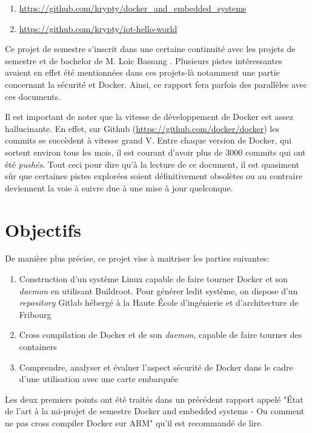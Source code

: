 \documentclass[11pt,a4paper,oneside]{report}
\newcommand{\school}{Haute École d'ingénierie et d'architecture de Fribourg}
\newcommand{\oldreportname}{État de l’art à la mi-projet de semestre Docker and embedded systems - Ou comment ne pas cross compiler Docker sur ARM}
\begin{document}
\begin{enumerate}
\item \url{https://github.com/krypty/docker_and_embedded_systems}
\item \url{https://github.com/krypty/iot-hello-world}
\end{enumerate}


Ce projet de semestre s'inscrit dans une certaine continuité avec les projets de semestre et de bachelor de M. Loic Bassang \cite{bassang_bachelor}. Plusieurs pistes intéressantes avaient en effet été mentionnées dans ces projets-là notamment une partie concernant la sécurité et Docker. Ainsi, ce rapport fera parfois des parallèles avec ces documents.

Il est important de noter que la vitesse de développement de Docker est assez hallucinante. En effet, sur Github (\url{https://github.com/docker/docker}) les commits se succèdent à vitesse grand V. Entre chaque version de Docker, qui sortent environ tous les mois, il est courant d'avoir plus de 3000 commits qui ont été \emph{pushés}. Tout ceci pour dire qu'à la lecture de ce document, il est quasiment sûr que certaines pistes explorées soient définitivement obsolètes ou au contraire deviennent la voie à suivre due à une mise à jour quelconque.


\section{Objectifs}

De manière plus précise, ce projet vise à maitriser les parties suivantes:

\begin{enumerate}
  \item Construction d'un système Linux capable de faire tourner Docker et son \emph{daemon} en utilisant Buildroot. Pour générer ledit système, on dispose d'un \emph{repository} Gitlab hébergé à la \school

  \item Cross compilation de Docker et de son \emph{daemon}, capable de faire tourner des containers

  \item Comprendre, analyser et évaluer l'aspect sécurité de Docker dans le cadre d'une utilisation avec une carte embarquée
\end{enumerate}

Les deux premiers points ont été traités dans un précédent rapport appelé "\oldreportname" qu'il est recommandé de lire.
\end{document}
